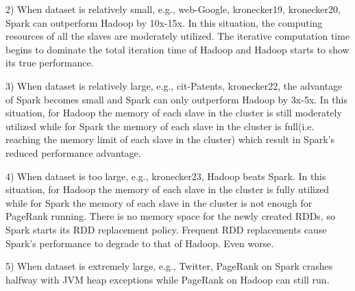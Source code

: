 \documentclass[12pt,conference,letterpaper]{IEEEtran}
\begin{document}
2) When dataset is relatively small, e.g., web-Google, kronecker19, kronecker20, Spark can outperform Hadoop by 10x-15x. In this situation, the computing resources of all the slaves are moderately utilized. The iterative computation time begins to dominate the total iteration time of Hadoop and Hadoop starts to show its true performance.

3) When dataset is relatively large, e.g., cit-Patents, kronecker22, the advantage of Spark becomes small and Spark can only outperform Hadoop by 3x-5x. In this situation, for Hadoop the memory of each slave in the cluster is still moderately utilized while for Spark the memory of each slave in the cluster is full(i.e. reaching the memory limit of each slave in the cluster) which result in Spark's reduced performance advantage.

4) When dataset is too large, e.g., kronecker23, Hadoop beats Spark. In this situation, for Hadoop the memory of each slave in the cluster is fully utilized while for Spark the memory of each slave in the cluster is not enough for PageRank running. There is no memory space for the newly created RDDs, so Spark starts its RDD replacement policy. Frequent RDD replacements cause Spark's performance to degrade to that of Hadoop. Even worse.  

5) When dataset is extremely large, e.g., Twitter, PageRank on Spark crashes halfway with JVM heap exceptions while PageRank on Hadoop can still run.


\end{document}
